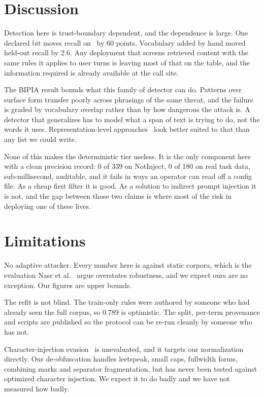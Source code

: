 \documentclass[sigconf,anonymous,review]{acmart}
\begin{document}
\section{Discussion}

Detection here is trust-boundary dependent, and the dependence is large. One
declared bit moves recall on~\cite{liu2024formalizing} by 60 points. Vocabulary
added by hand moved held-out recall by 2.6. Any deployment that screens retrieved
content with the same rules it applies to user turns is leaving most of that on
the table, and the information required is already available at the call site.

The BIPIA result bounds what this family of detector can do. Patterns over
surface form transfer poorly across phrasings of the same threat, and the failure
is graded by vocabulary overlap rather than by how dangerous the attack is. A
detector that generalizes has to model what a span of text is trying to do, not
the words it uses. Representation-level approaches~\cite{pishield2025} look
better suited to that than any list we could write.

None of this makes the deterministic tier useless. It is the only component here
with a clean precision record: 0 of 339 on NotInject, 0 of 180 on real task data,
sub-millisecond, auditable, and it fails in ways an operator can read off a
config file. As a cheap first filter it is good. As a solution to indirect prompt
injection it is not, and the gap between those two claims is where most of the
risk in deploying one of these lives.

\section{Limitations}
\label{sec:limitations}

No adaptive attacker. Every number here is against static corpora, which is the
evaluation Nasr et al.~\cite{nasr2025attacker} argue overstates robustness, and
we expect ours are no exception. Our figures are upper bounds.

The refit is not blind. The train-only rules were authored by someone who had
already seen the full corpus, so 0.789 is optimistic. The split, per-term
provenance and scripts are published so the protocol can be re-run cleanly by
someone who has not.

Character-injection evasion~\cite{hackett2025bypassing} is unevaluated, and it
targets our normalization directly. Our de-obfuscation handles leetspeak, small
caps, fullwidth forms, combining marks and separator fragmentation, but has never
been tested against optimized character injection. We expect it to do badly and
we have not measured how badly.
\end{document}
